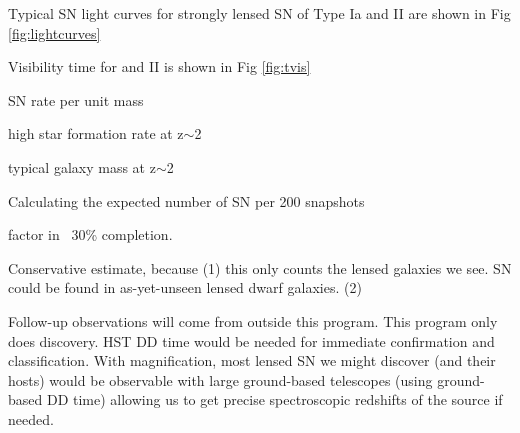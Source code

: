 




\medskip
{}

Typical SN light curves for strongly lensed SN of Type Ia and II are shown in Fig \ref{fig:lightcurves}

Visibility time for \SNIa and II is shown in Fig \ref{fig:tvis}

SN rate per unit mass \citep{Mannucci:2005}

high star formation rate at z$\sim$2

typical galaxy mass at z$\sim$2

Calculating the expected number of SN per 200 snapshots

factor in ~30\% completion.

Conservative estimate, because  
 (1) this only counts the lensed galaxies we see.  SN could be found
 in as-yet-unseen lensed dwarf galaxies. 
 (2) 



Follow-up observations will come from outside this program. 
This program only does discovery.
HST DD time would be needed for immediate confirmation and classification.
With magnification, most lensed SN we might discover (and their hosts)
would be observable with large ground-based telescopes (using
ground-based DD time)   allowing us to get precise spectroscopic
redshifts of the source if needed.

